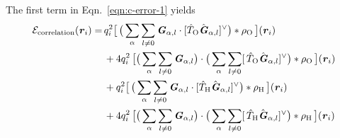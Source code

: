 \documentclass[aps,pre,preprint,unsortedaddress]{revtex4}
\renewcommand{\v}[1]{\textbf{\textit{#1}}}
\renewcommand{\d}[1]{\textsf{#1}}
\begin{document}
The first term in Eqn.~\eqref{eqn:c-error-1} yields
\begin{align}\nonumber
  \mathcal E_{\textrm{correlation}}(\v r_i)
  =\,&
  q_i^2
  \big[\,
  \big(
  \sum_{\alpha} \sum_{l\neq 0}
  \v G_{\alpha,l}\cdot[\hat T_{\textrm{O}}\hat{\v G}_{\alpha,l}]^{\vee}
  \big)
  \ast \rho_{\textrm{O}}
  \,\big] (\v r_i) \\\nonumber
  \,&+
  4q_i^2\,
  \big[
  \big(
  \sum_{\alpha} \sum_{l\neq 0}  
  \v G_{\alpha,l}
  \big)
  \cdot
  \big(
  \sum_{\alpha} \sum_{l\neq 0}  
  [\,\hat T_{\textrm{O}}\hat{\v G}_{\alpha,l}]^{\vee}
  \big)
  \ast \rho_{\textrm{O}}\,
  \big] (\v r_i) \\\nonumber
  \,&+
  q_i^2
  \big[\,
  \big(
  \sum_{\alpha} \sum_{l\neq 0}
  \v G_{\alpha,l}\cdot[\hat T_{\textrm{H}}\hat{\v G}_{\alpha,l}]^{\vee}
  \big)
  \ast \rho_{\textrm{H}}
  \,\big] (\v r_i) \\
  \,&+
  4q_i^2\,
  \big[
  \big(
  \sum_{\alpha} \sum_{l\neq 0}  
  \v G_{\alpha,l}
  \big)
  \cdot
  \big(
  \sum_{\alpha} \sum_{l\neq 0}  
  [\,\hat T_{\textrm{H}}\hat{\v G}_{\alpha,l}]^{\vee}
  \big)
  \ast \rho_{\textrm{H}}\,
  \big] (\v r_i) 
\end{align}
\end{document}
